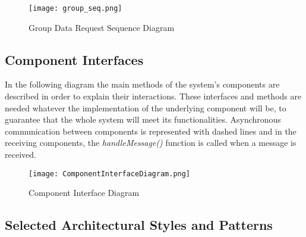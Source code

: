 \FloatBarrier
\begin{figure}[!h]
	\centering
	\texttt{[image: group\_seq.png]}
	\caption{Group Data Request Sequence Diagram}
\end{figure}
\FloatBarrier

\subsection{Component Interfaces}
In the following diagram the main methods of the system's components are described in order to explain their interactions. These interfaces and methods are needed whatever the implementation of the underlying component will be, to guarantee that the whole system will meet its functionalities.
Asynchronous communication between components is represented with dashed lines and in the receiving components, the \textit{handleMessage()} function is called when a message is received.

\FloatBarrier
\begin{figure}[!h]
	\centering
	\texttt{[image: ComponentInterfaceDiagram.png]}
	\caption{Component Interface Diagram}
\end{figure}
\FloatBarrier

\subsection{Selected Architectural Styles and Patterns}

